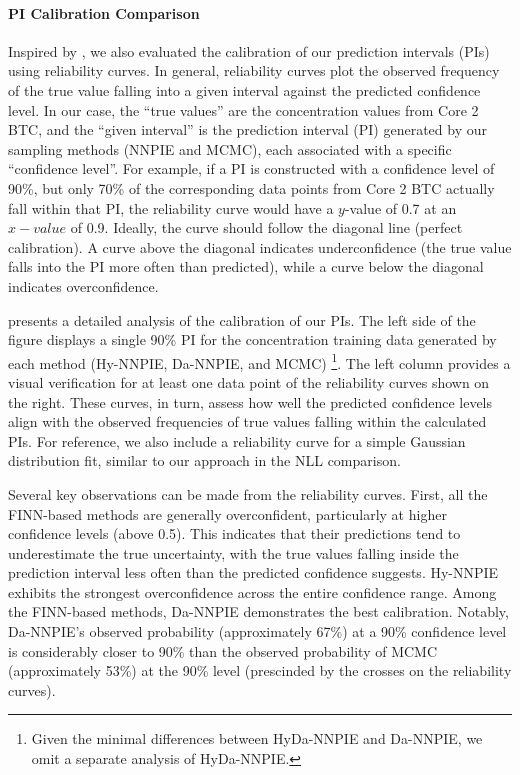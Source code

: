 \paragraph{PI Calibration Comparison}
Inspired by \textcite{finn}, we also evaluated the calibration of our prediction intervals (PIs) using reliability curves. In general, reliability curves plot the observed frequency of the true value falling into a given interval against the predicted confidence level. In our case, the ``true values'' are the concentration values from Core 2 BTC, and the ``given interval'' is the prediction interval (PI) generated by our sampling methods (NNPIE and MCMC), each associated with a specific ``confidence level''. For example, if a PI is constructed with a confidence level of 90\%, but only 70\% of the corresponding data points from Core 2 BTC actually fall within that PI, the reliability curve would have a $y$-value of 0.7 at an $x-value$ of 0.9.
Ideally, the curve should follow the diagonal line (perfect calibration). A curve above the diagonal indicates underconfidence (the true value falls into the PI more often than predicted), while a curve below the diagonal indicates overconfidence.

 presents a detailed analysis of the calibration of our PIs. The left side of the figure displays a single 90\% PI for the concentration training data generated by each method (Hy-NNPIE, Da-NNPIE, and MCMC) \footnote{Given the minimal differences between HyDa-NNPIE and Da-NNPIE, we omit a separate analysis of HyDa-NNPIE.}. The left column provides a visual verification for at least one data point of the reliability curves shown on the right. These curves, in turn, assess how well the predicted confidence levels align with the observed frequencies of true values falling within the calculated PIs. For reference, we also include a reliability curve for a simple Gaussian distribution fit, similar to our approach in the NLL comparison.

Several key observations can be made from the reliability curves. First, all the FINN-based methods are generally overconfident, particularly at higher confidence levels (above 0.5). This indicates that their predictions tend to underestimate the true uncertainty, with the true values falling inside the prediction interval less often than the predicted confidence suggests. Hy-NNPIE exhibits the strongest overconfidence across the entire confidence range. Among the FINN-based methods, Da-NNPIE demonstrates the best calibration. Notably, Da-NNPIE's observed probability (approximately 67\%) at a 90\% confidence level is considerably closer to 90\% than the observed probability of MCMC (approximately 53\%) at the 90\% level (prescinded by the crosses on the reliability curves).

